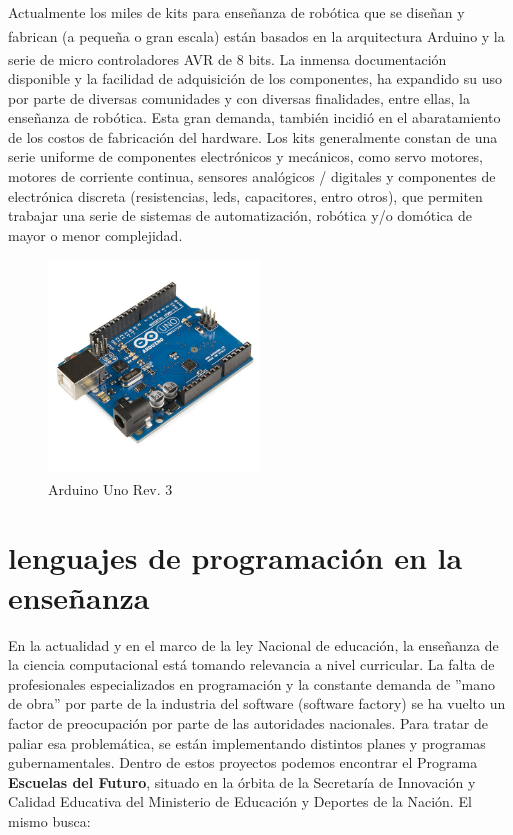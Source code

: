 Actualmente los miles de kits para enseñanza de robótica que se diseñan y fabrican (a pequeña o gran escala) están basados en la arquitectura Arduino\textsuperscript{\texttrademark} y la serie de micro controladores AVR\textsuperscript{\textregistered} de 8 bits. La inmensa documentación disponible y la facilidad de adquisición de los componentes, ha expandido su uso por parte de diversas comunidades y con diversas finalidades, entre ellas, la enseñanza de robótica. Esta gran demanda,  también incidió en el abaratamiento de los costos de fabricación del hardware. Los kits generalmente constan de una serie uniforme de componentes electrónicos y mecánicos, como servo motores, motores de corriente continua, sensores analógicos / digitales y componentes de electrónica discreta (resistencias, leds, capacitores, entro otros), que permiten trabajar una serie de sistemas de automatización, robótica y/o domótica de mayor o menor complejidad.

\begin{figure}
  \begin{center}
    \includegraphics[width=0.5\textwidth]{figuras/Arduino_Uno_-_R3.jpg}
    \caption[Caption for LOF]{Arduino\textsuperscript{\texttrademark} Uno Rev. 3}
       
    \label{fig:arduinouno }
  \end{center}
\end{figure}

\section{lenguajes de programación en la enseñanza}

En la actualidad y en el marco de la ley Nacional de educación, la enseñanza de la ciencia computacional está tomando relevancia a nivel curricular. La falta de profesionales especializados en programación y la constante demanda de ''mano de obra'' por parte de la industria del software (software factory) se ha vuelto un factor de preocupación por parte de las autoridades nacionales. Para tratar de paliar esa problemática, se están implementando distintos planes y programas gubernamentales. Dentro de estos proyectos podemos encontrar el Programa \textbf{Escuelas del Futuro}, situado en la órbita de la Secretaría de Innovación y Calidad Educativa del Ministerio de Educación y Deportes de la Nación. El mismo busca: 

